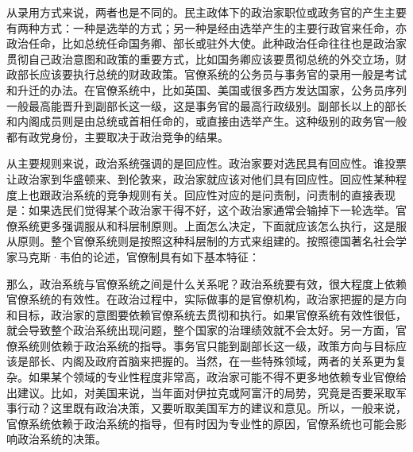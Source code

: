 从录用方式来说，两者也是不同的。民主政体下的政治家职位或政务官的产生主要有两种方式：一种是选举的方式；另一种是经由选举产生的主要行政官来任命，亦政治任命，比如总统任命国务卿、部长或驻外大使。此种政治任命往往也是政治家贯彻自己政治意图和政策的重要方式，比如国务卿应该要贯彻总统的外交立场，财政部长应该要执行总统的财政政策。官僚系统的公务员与事务官的录用一般是考试和升迁的办法。在官僚系统中，比如英国、美国或很多西方发达国家，公务员序列一般最高能晋升到副部长这一级，这是事务官的最高行政级别。副部长以上的部长和内阁成员则是由总统或首相任命的，或直接由选举产生。这种级别的政务官一般都有政党身份，主要取决于政治竞争的结果。

从主要规则来说，政治系统强调的是回应性。政治家要对选民具有回应性。谁投票让政治家到华盛顿来、到伦敦来，政治家就应该对他们具有回应性。回应性某种程度上也跟政治系统的竞争规则有关。回应性对应的是问责制，问责制的直接表现是：如果选民们觉得某个政治家干得不好，这个政治家通常会输掉下一轮选举。官僚系统更多强调服从和科层制原则。上面怎么决定，下面就应该怎么执行，这是服从原则。整个官僚系统则是按照这种科层制的方式来组建的。按照德国著名社会学家马克斯·韦伯的论述，官僚制具有如下基本特征：


那么，政治系统与官僚系统之间是什么关系呢？政治系统要有效，很大程度上依赖官僚系统的有效性。在政治过程中，实际做事的是官僚机构，政治家把握的是方向和目标，政治家的意图要依赖官僚系统去贯彻和执行。如果官僚系统有效性很低，就会导致整个政治系统出现问题，整个国家的治理绩效就不会太好。另一方面，官僚系统则依赖于政治系统的指导。事务官只能到副部长这一级，政策方向与目标应该是部长、内阁及政府首脑来把握的。当然，在一些特殊领域，两者的关系更为复杂。如果某个领域的专业性程度非常高，政治家可能不得不更多地依赖专业官僚给出建议。比如，对美国来说，当年面对伊拉克或阿富汗的局势，究竟是否要采取军事行动？这里既有政治决策，又要听取美国军方的建议和意见。所以，一般来说，官僚系统依赖于政治系统的指导，但有时因为专业性的原因，官僚系统也可能会影响政治系统的决策。

